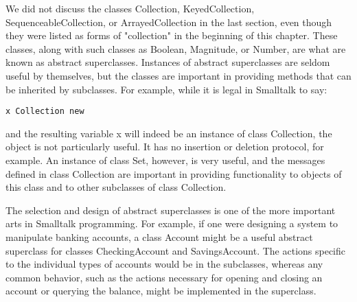 
We did not discuss the classes Collection, KeyedCollection,
SequenceableCollection, or ArrayedCollection in the last section, even
though they were listed as forms of "collection" in the beginning of this
chapter. These classes, along with such classes as Boolean, Magnitude,
or Number, are what are known as abstract superclasses. Instances of
abstract superclasses are seldom useful by themselves, but the classes are
important in providing methods that can be inherited by subclasses. For
example, while it is legal in Smalltalk to say:
\begin{lstlisting}
x Collection new
\end{lstlisting}
and the resulting variable x will indeed be an instance of class Collection,
the object is not particularly useful. It has no insertion or deletion protocol,
for example. An instance of class Set, however, is very useful, and the
messages defined in class Collection are important in providing functionality to objects of this class and to other subclasses of class Collection.

The selection and design of abstract superclasses is one of the more
important arts in Smalltalk programming. For example, if one were designing a system to manipulate banking accounts, a class Account might be
a useful abstract superclass for classes CheckingAccount and
SavingsAccount. The actions specific to the individual types of accounts
would be in the subclasses, whereas any common behavior, such as the
actions necessary for opening and closing an account or querying the
balance, might be implemented in the superclass.
